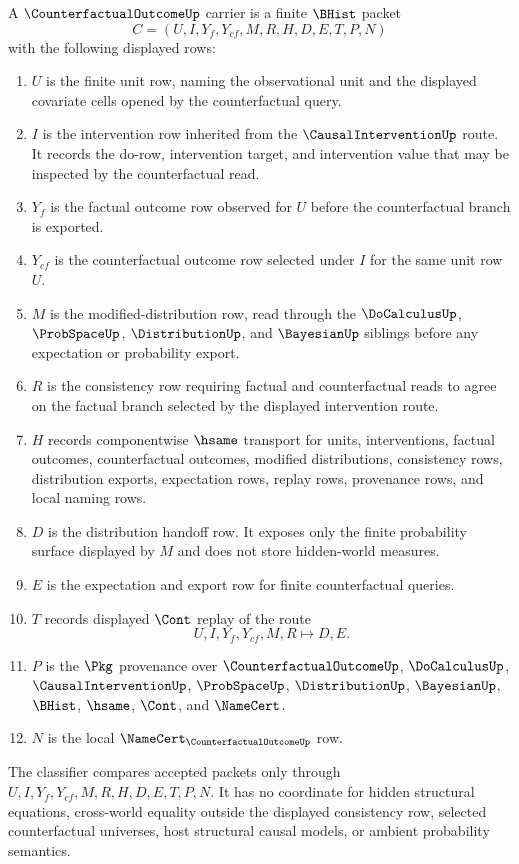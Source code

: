\begin{definition}
\label{def:counterfactual-outcome-carrier}
A $\CounterfactualOutcomeUp$ carrier is a finite $\BHist$ packet
$$
C=(U,I,Y_f,Y_{cf},M,R,H,D,E,T,P,N)
$$
with the following displayed rows:
\begin{enumerate}
\item $U$ is the finite unit row, naming the observational unit and the displayed covariate cells opened by the counterfactual query.
\item $I$ is the intervention row inherited from the $\CausalInterventionUp$ route. It records the do-row, intervention target, and intervention value that may be inspected by the counterfactual read.
\item $Y_f$ is the factual outcome row observed for $U$ before the counterfactual branch is exported.
\item $Y_{cf}$ is the counterfactual outcome row selected under $I$ for the same unit row $U$.
\item $M$ is the modified-distribution row, read through the $\DoCalculusUp$, $\ProbSpaceUp$, $\DistributionUp$, and $\BayesianUp$ siblings before any expectation or probability export.
\item $R$ is the consistency row requiring factual and counterfactual reads to agree on the factual branch selected by the displayed intervention route.
\item $H$ records componentwise $\hsame$ transport for units, interventions, factual outcomes, counterfactual outcomes, modified distributions, consistency rows, distribution exports, expectation rows, replay rows, provenance rows, and local naming rows.
\item $D$ is the distribution handoff row. It exposes only the finite probability surface displayed by $M$ and does not store hidden-world measures.
\item $E$ is the expectation and export row for finite counterfactual queries.
\item $T$ records displayed $\Cont$ replay of the route
$$
U,I,Y_f,Y_{cf},M,R \longmapsto D,E .
$$
\item $P$ is the $\Pkg$ provenance over $\CounterfactualOutcomeUp$, $\DoCalculusUp$, $\CausalInterventionUp$, $\ProbSpaceUp$, $\DistributionUp$, $\BayesianUp$, $\BHist$, $\hsame$, $\Cont$, and $\NameCert$.
\item $N$ is the local $\NameCert_{\CounterfactualOutcomeUp}$ row.
\end{enumerate}
The classifier compares accepted packets only through $U,I,Y_f,Y_{cf},M,R,H,D,E,T,P,N$. It has no coordinate for hidden structural equations, cross-world equality outside the displayed consistency row, selected counterfactual universes, host structural causal models, or ambient probability semantics.
\end{definition}

